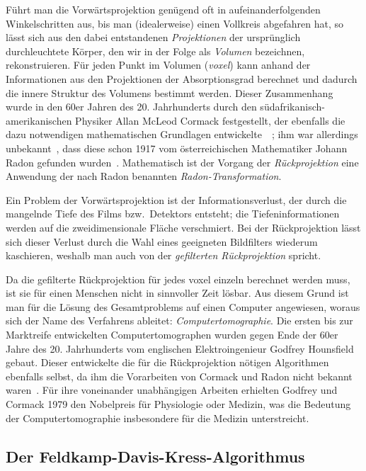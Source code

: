 Führt man die Vorwärtsprojektion genügend oft in aufeinanderfolgenden Winkelschritten aus, bis man (idealerweise) einen
Vollkreis abgefahren hat, so lässt sich aus den dabei entstandenen \textit{Projektionen} der ursprünglich durchleuchtete
Körper, den wir in der Folge als \textit{Volumen} bezeichnen, rekonstruieren. Für jeden Punkt im Volumen
(\textit{\gls{voxel}}) kann anhand der Informationen aus den Projektionen der Absorptionsgrad berechnet und dadurch die
innere Struktur des Volumens bestimmt werden. Dieser Zusammenhang wurde in den 60er Jahren des 20. Jahrhunderts durch
den südafrikanisch-amerikanischen Physiker Allan McLeod Cormack festgestellt, der ebenfalls die dazu notwendigen
mathematischen Grundlagen entwickelte~\cite{cormack63}~\cite{cormack64}; ihm war allerdings unbekannt~\cite{cormack79},
dass diese schon 1917 vom österreichischen Mathematiker Johann Radon gefunden wurden~\cite{radon}. Mathematisch ist der
Vorgang der \textit{Rückprojektion} eine Anwendung der nach Radon benannten \textit{Radon-Transformation}.

Ein Problem der Vorwärtsprojektion ist der Informationsverlust, der durch die mangelnde Tiefe des Films bzw.\ Detektors
entsteht; die Tiefeninformationen werden auf die zweidimensionale Fläche {\glqq}verschmiert{\grqq}. Bei der
Rückprojektion lässt sich dieser Verlust durch die Wahl eines geeigneten Bildfilters wiederum kaschieren, weshalb man
auch von der \textit{gefilterten Rückprojektion} spricht.

Da die gefilterte Rückprojektion für jedes \gls{voxel} einzeln berechnet werden muss, ist sie für einen Menschen nicht
in sinnvoller Zeit lösbar. Aus diesem Grund ist man für die Lösung des Gesamtproblems auf einen Computer angewiesen,
woraus sich der Name des Verfahrens ableitet: \textit{Computertomographie}. Die ersten bis zur Marktreife entwickelten
Computertomographen wurden gegen Ende der 60er Jahre des 20. Jahrhunderts vom englischen Elektroingenieur Godfrey
Hounsfield gebaut. Dieser entwickelte die für die Rückprojektion nötigen Algorithmen ebenfalls selbst, da ihm die
Vorarbeiten von Cormack und Radon nicht bekannt waren~\cite{kalender}. Für ihre voneinander unabhängigen Arbeiten
erhielten Godfrey und Cormack 1979 den Nobelpreis für Physiologie oder Medizin, was die Bedeutung der
Computertomographie insbesondere für die Medizin unterstreicht.

\subsection{Der Feldkamp-Davis-Kress-Algorithmus}

